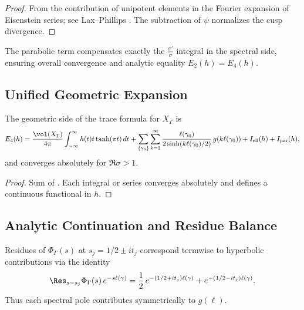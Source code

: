 \begin{proof}\relax
From the contribution of unipotent elements in the Fourier expansion of Eisenstein series; see Lax–Phillips \cite{LaxPhillips1989}. The subtraction of $\psi$ normalizes the cusp divergence. %
\end{proof}

\begin{remark}\label{rem:parabolic-consistency}\relax
The parabolic term compensates exactly the $\frac{\sigma'}{\sigma}$ integral in the spectral side, ensuring overall convergence and analytic equality $E_2(h)=E_4(h)$. %
\end{remark}

\subsection{Unified Geometric Expansion}\relax\hspace{0pt}
\label{subsec:unified-geom}\relax\hspace{0pt}

\begin{theorem}\label{thm:geom-unified}\relax
The geometric side of the trace formula for $X_\Gamma$ is
\[
E_4(h)=\frac{\vol(X_\Gamma)}{4\pi}\int_{-\infty}^{\infty}h(t)t\tanh(\pi t)\,dt
+\sum_{\{\gamma_0\}}\sum_{k=1}^{\infty}\frac{\ell(\gamma_0)}{2\sinh(k\ell(\gamma_0)/2)}\,g(k\ell(\gamma_0))
+I_{\mathrm{ell}}(h)+I_{\mathrm{par}}(h),
\]
and converges absolutely for $\Re\sigma>1$. %
\end{theorem}

\begin{proof}\relax
Sum of . Each integral or series converges absolutely and defines a continuous functional in $h$. %
\end{proof}

\subsection{Analytic Continuation and Residue Balance}\relax\hspace{0pt}
\label{subsec:analytic-cont}\relax\hspace{0pt}

\begin{lemma}\label{lem:res-balance}\relax
Residues of $\Phi_\Gamma(s)$ at $s_j=1/2\pm it_j$ correspond termwise to hyperbolic contributions via the identity
\[
\Res_{s=s_j}\Phi_\Gamma(s)\,e^{-s\ell(\gamma)}=\frac{1}{2}\,e^{-(1/2+it_j)\ell(\gamma)}+e^{-(1/2-it_j)\ell(\gamma)}.
\]
Thus each spectral pole contributes symmetrically to $g(\ell)$. %
\end{lemma}

